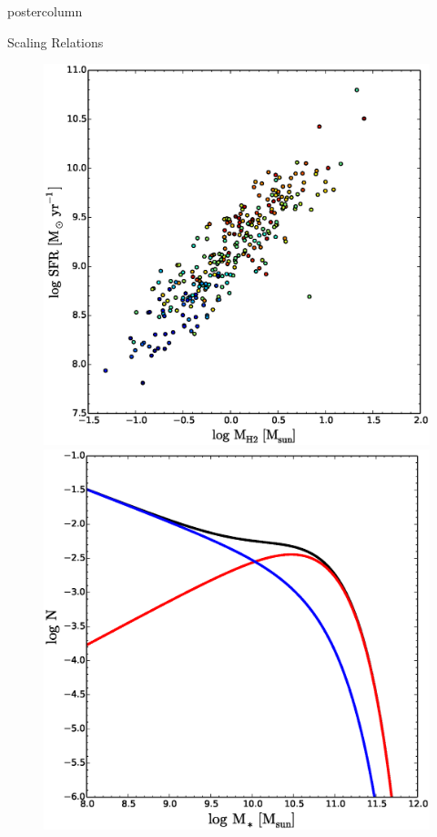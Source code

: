 \documentclass{beamer}
\begin{document}
\begin{frame}
\begin{columns}
\begin{column}{.5\textwidth}
\begin{beamercolorbox}[center,wd=\textwidth]{postercolumn}
\begin{minipage}[T]{.95\textwidth}
{\begin{myblock}{\LARGE Scaling Relations}
						\begin{figure}
							\begin{minipage}{0.32\textwidth}
								\centering\includegraphics[width=\textwidth]{img/scalrelns.eps}
								\caption{}
							\end{minipage}
							\begin{minipage}{0.32\textwidth}
								\centering\includegraphics[width=\textwidth]{img/Baldry.eps}

\end{minipage}
\end{figure}
\end{myblock}}
\end{minipage}
\end{beamercolorbox}
\end{column}
\end{columns}
\end{frame}
\end{document}
